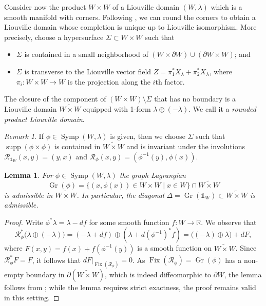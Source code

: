 \documentclass[12pt]{article}
\theoremstyle{theorem}
\newtheorem{lemma}[theorem]{Lemma}
\theoremstyle{definition}
\theoremstyle{remark}
\newtheorem{remark}[theorem]{Remark}
\numberwithin{equation}{section}
\newcommand{\p}{\partial}
\newcommand{\R}{{\mathbb{R}}}
\DeclareMathOperator{\supp}{supp}
\DeclareMathOperator{\Gr}{Gr}
\DeclareMathOperator{\Symp}{Symp}
\DeclareMathOperator{\Fix}{Fix}
\begin{document}
Consider now the product $W\times W$ of a Liouville domain $(W,\lambda)$ which is a smooth manifold with corners.
Following \cite[Section~3.d]{Oa06}, we can round the corners to obtain a Liouville domain whose completion is unique up to Liouville isomorphism.
More precisely, choose a hypersurface $\Sigma\subset  W\times W$ such that
\begin{itemize}
	\item $\Sigma$ is contained in a small neighborhood of $(W\times \p W) \cup (\p W\times W)$; and
	\item $\Sigma$ is transverse to the Liouville vector field $Z=\pi_1^*X_\lambda+\pi_2^*X_\lambda$, where $\pi_i\colon W\times W\to W$ is the projection along the $i$th factor.
\end{itemize}
The closure of the component of $(W\times W)\setminus \Sigma$ that has no boundary is a Liouville domain $\widetilde{W\times W}$ equipped with 1-form $\lambda\oplus (-\lambda)$.
We call it a \emph{rounded product Liouville domain}.
\begin{remark}\label{rem: hypersurface_phi}
If $\phi\in \Symp(W,\lambda)$ is given, then we choose $\Sigma$ such that $\supp(\phi\times \phi)$ is contained in $\widetilde{W\times W}$ and is invariant under the involutions $\mathcal{R}_{\mathds{1}_W}(x,y)=(y,x)$ and $\mathcal{R}_\phi(x,y)=(\phi^{-1}(y),\phi(x))$.	
\end{remark}
\begin{lemma}\label{lem: graph_admissible}
For $\phi\in \Symp(W,\lambda)$ the graph Lagrangian
$$
\Gr(\phi)=\{(x,\phi(x))\in W\times W\mid x\in W\}\cap \widetilde{W\times W}
$$ is admissible in $\widetilde{W\times W}$.
In particular, the diagonal $\Delta=\Gr(\mathds{1}_W)\subset \widetilde{W\times W}$ is admissible.
\end{lemma}
\begin{proof}
Write $\phi^*\lambda=\lambda-df$ for some smooth function $f\colon W\to \R$.
We observe that
$$
\mathcal{R}_\phi^*\big(\lambda\oplus(-\lambda)\big) = (-\lambda+df)\oplus(\lambda+d(\phi^{-1})^*f) = \big((-\lambda)\oplus \lambda\big) + dF,
$$
where $F(x,y)=f(x)+f(\phi^{-1}(y))$ is a smooth function on $\widetilde{W\times W}$.
Since $\mathcal{R}_\phi^*F=F$, it follows that $dF|_{\Fix(\mathcal{R}_\phi)}=0$.
As $\Fix(\mathcal{R}_\phi)=\Gr(\phi)$ has a non-empty boundary in $\p( \widetilde{W\times W})$, which is indeed diffeomorphic to $\p W$, the lemma follows from \cite[Lemma~3.1]{KKL18}; while the lemma requires strict exactness, the proof remains valid in this setting.
\end{proof}
\end{document}
